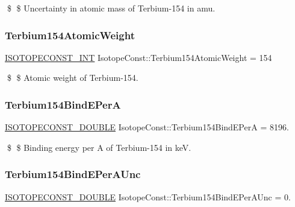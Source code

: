 \$ \$ Uncertainty in atomic mass of Terbium-\/154 in amu. \mbox{\label{group___isotope_const-_terbium-_tb154_gae7298fdbed0aa583efe601c91699064f}} 
\subsubsection{\texorpdfstring{Terbium154\+Atomic\+Weight}{Terbium154AtomicWeight}}
{\footnotesize\ttfamily \mbox{\hyperlink{group___isotope_const-_macros_ga5f18360b3e99483a35c32d789e62621c}{I\+S\+O\+T\+O\+P\+E\+C\+O\+N\+S\+T\+\_\+\+I\+NT}} Isotope\+Const\+::\+Terbium154\+Atomic\+Weight = 154}

\$ \$ Atomic weight of Terbium-\/154. \mbox{\label{group___isotope_const-_terbium-_tb154_ga0eb9e20b5715996d6e590899d3582313}} 
\subsubsection{\texorpdfstring{Terbium154\+Bind\+E\+PerA}{Terbium154BindEPerA}}
{\footnotesize\ttfamily \mbox{\hyperlink{group___isotope_const-_macros_ga8f45a7272ce02c0b4c65c44636ed719a}{I\+S\+O\+T\+O\+P\+E\+C\+O\+N\+S\+T\+\_\+\+D\+O\+U\+B\+LE}} Isotope\+Const\+::\+Terbium154\+Bind\+E\+PerA = 8196.}

\$ \$ Binding energy per A of Terbium-\/154 in keV. \mbox{\label{group___isotope_const-_terbium-_tb154_ga07996f34b817934b44a2309e24478356}} 
\subsubsection{\texorpdfstring{Terbium154\+Bind\+E\+Per\+A\+Unc}{Terbium154BindEPerAUnc}}
{\footnotesize\ttfamily \mbox{\hyperlink{group___isotope_const-_macros_ga8f45a7272ce02c0b4c65c44636ed719a}{I\+S\+O\+T\+O\+P\+E\+C\+O\+N\+S\+T\+\_\+\+D\+O\+U\+B\+LE}} Isotope\+Const\+::\+Terbium154\+Bind\+E\+Per\+A\+Unc = 0.}

